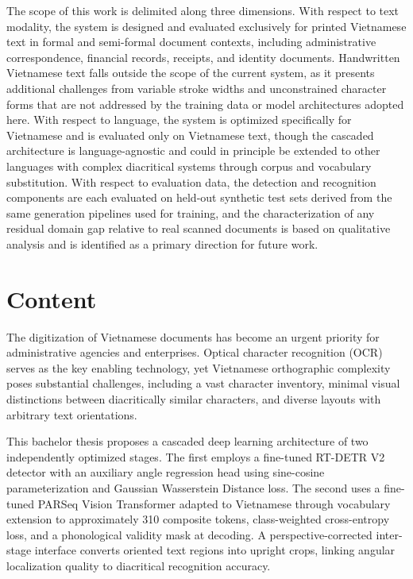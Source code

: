 The scope of this work is delimited along three dimensions. With respect to text modality, the system is designed and evaluated exclusively for printed Vietnamese text in formal and semi-formal document contexts, including administrative correspondence, financial records, receipts, and identity documents. Handwritten Vietnamese text falls outside the scope of the current system, as it presents additional challenges from variable stroke widths and unconstrained character forms that are not addressed by the training data or model architectures adopted here. With respect to language, the system is optimized specifically for Vietnamese and is evaluated only on Vietnamese text, though the cascaded architecture is language-agnostic and could in principle be extended to other languages with complex diacritical systems through corpus and vocabulary substitution. With respect to evaluation data, the detection and recognition components are each evaluated on held-out synthetic test sets derived from the same generation pipelines used for training, and the characterization of any residual domain gap relative to real scanned documents is based on qualitative analysis and is identified as a primary direction for future work.

\section{Content}

The digitization of Vietnamese documents has become an urgent priority for administrative agencies and enterprises. Optical character recognition (OCR) serves as the key enabling technology, yet Vietnamese orthographic complexity poses substantial challenges, including a vast character inventory, minimal visual distinctions between diacritically similar characters, and diverse layouts with arbitrary text orientations.

This bachelor thesis proposes a cascaded deep learning architecture of two independently optimized stages. The first employs a fine-tuned RT-DETR V2 detector with an auxiliary angle regression head using sine-cosine parameterization and Gaussian Wasserstein Distance loss. The second uses a fine-tuned PARSeq Vision Transformer adapted to Vietnamese through vocabulary extension to approximately 310 composite tokens, class-weighted cross-entropy loss, and a phonological validity mask at decoding. A perspective-corrected inter-stage interface converts oriented text regions into upright crops, linking angular localization quality to diacritical recognition accuracy.

